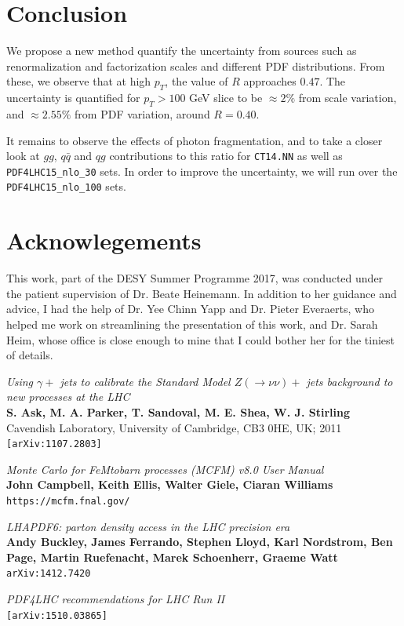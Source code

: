 \documentclass[11pt,a4paper,final]{report}
\begin{document}
\section{Conclusion}
We propose a new method quantify the uncertainty from sources such as renormalization and factorization scales and different PDF distributions. From these, we observe that at high $p_T$, the value of $R$ approaches $0.47$. The uncertainty is quantified for $p_T > 100$ GeV slice to be $\approx 2\%$ from scale variation, and $\approx 2.55\%$ from PDF variation, around $R = 0.40$.

It remains to observe the effects of photon fragmentation, and to take a closer look at $gg$, $q\bar{q}$ and $qg$ contributions to this ratio for \texttt{CT14.NN} as well as \texttt{PDF4LHC15\_nlo\_30} sets. In order to improve the uncertainty, we will run over the \texttt{PDF4LHC15\_nlo\_100} sets.

\section*{Acknowlegements}
This work, part of the DESY Summer Programme 2017, was conducted under the patient supervision of Dr. Beate Heinemann. In addition to her guidance and advice, I had the help of Dr. Yee Chinn Yapp and Dr. Pieter Everaerts, who helped me work on streamlining the presentation of this work, and Dr. Sarah Heim, whose office is close enough to mine that I could bother her for the tiniest of details.

\begin{thebibliography}{9}
	\textit{Using $\gamma +$ jets to calibrate the Standard Model $Z(\rightarrow \nu\nu)+$ jets background to new processes at the LHC}\\
	\textbf{S. Ask, M. A. Parker, T. Sandoval, M. E. Shea, W. J. Stirling}\\
Cavendish Laboratory, University of Cambridge, CB3 0HE, UK; 2011\\
	\texttt{[arXiv:1107.2803]}

	\textit{Monte Carlo for FeMtobarn processes (MCFM) v8.0 User Manual}\\
	\textbf{John Campbell, Keith Ellis, Walter Giele, Ciaran Williams}\\
	\texttt{https://mcfm.fnal.gov/}
	
	\textit{LHAPDF6: parton density access in the LHC precision era}\\
	\textbf{Andy Buckley, James Ferrando, Stephen Lloyd, Karl Nordstrom, Ben Page, Martin Ruefenacht, Marek Schoenherr, Graeme Watt}\\
	\texttt{arXiv:1412.7420}
	
	\textit{PDF4LHC recommendations for LHC Run II}\\
	\texttt{[arXiv:1510.03865]}

\end{thebibliography}
\end{document}
